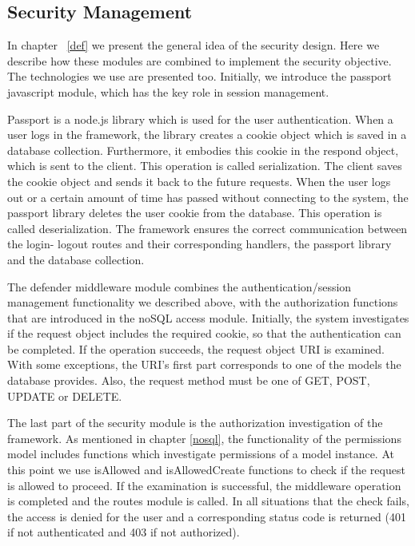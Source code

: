 \subsection{Security Management}
\label{security}
In chapter ~\ref{def} we present the general idea of the security design. Here we describe how these modules are combined to implement the security objective. The technologies we use are presented too. Initially, we introduce the passport javascript module, which has the key role in session management. \par
	Passport is a node.js library which is used for the user authentication. When a user logs in the framework, the library creates a cookie object which is saved in a database collection. Furthermore, it embodies this cookie in the respond object, which is sent to the client. This operation is called serialization. The client saves the cookie object and sends it back to the future requests. When the user logs out or a certain amount of time has passed without connecting to the system, the passport library deletes the user cookie from the database. This operation is called deserialization. The framework ensures the correct communication between the login- logout routes and their corresponding handlers, the passport library and the database collection. \par 
	The defender middleware module combines the authentication/session management functionality we described above, with the authorization functions that are introduced in the noSQL access module. Initially, the system investigates if the request object includes the required cookie, so that the authentication can be completed. If the operation succeeds, the request object URI is examined. With some exceptions, the URI's first part corresponds to one of the models  the database provides. Also, the request method must be one of GET, POST, UPDATE or DELETE. \par 
	The last part of the security module is the authorization investigation of the framework. As mentioned in chapter \ref{nosql}, the functionality of the permissions model includes functions which investigate permissions of a model instance. At this point we use isAllowed and isAllowedCreate functions to check if the request is allowed to proceed. If the examination is successful, the middleware operation is completed and the routes module is called. In all situations that the check fails, the access is denied for the user and a corresponding status code is returned (401 if not authenticated and 403 if not authorized).

